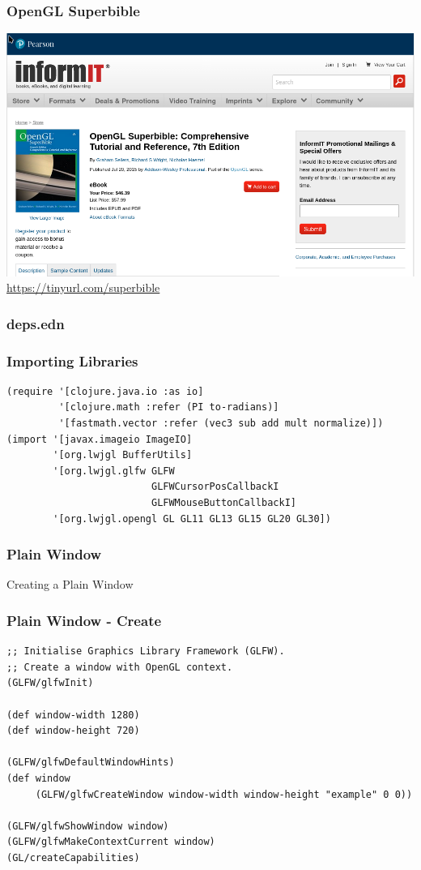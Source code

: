 \documentclass[aspectratio=169,11pt,xcolor=dvipsnames]{beamer}
\begin{document}
\begin{frame}
  \frametitle{OpenGL Superbible}
  \begin{center}
    \includegraphics[width=.35\textwidth]{superbible}\\
    \url{https://tinyurl.com/superbible}
  \end{center}
\end{frame}

\begin{frame}[fragile]
  \frametitle{deps.edn}
  
\end{frame}

\begin{frame}[fragile]
  \frametitle{Importing Libraries}
  \begin{verbatim}
(require '[clojure.java.io :as io]
         '[clojure.math :refer (PI to-radians)]
         '[fastmath.vector :refer (vec3 sub add mult normalize)])
(import '[javax.imageio ImageIO]
        '[org.lwjgl BufferUtils]
        '[org.lwjgl.glfw GLFW
                         GLFWCursorPosCallbackI
                         GLFWMouseButtonCallbackI]
        '[org.lwjgl.opengl GL GL11 GL13 GL15 GL20 GL30])
  \end{verbatim}
\end{frame}

\begin{frame}
  \frametitle{Plain Window}
  \begin{center}
    \begin{huge}
      Creating a Plain Window
    \end{huge}
  \end{center}
\end{frame}

\begin{frame}[fragile]
  \frametitle{Plain Window {-} Create}
  \begin{verbatim}
;; Initialise Graphics Library Framework (GLFW).
;; Create a window with OpenGL context.
(GLFW/glfwInit)

(def window-width 1280)
(def window-height 720)

(GLFW/glfwDefaultWindowHints)
(def window
     (GLFW/glfwCreateWindow window-width window-height "example" 0 0))

(GLFW/glfwShowWindow window)
(GLFW/glfwMakeContextCurrent window)
(GL/createCapabilities)
  \end{verbatim}
\end{frame}
\end{document}
